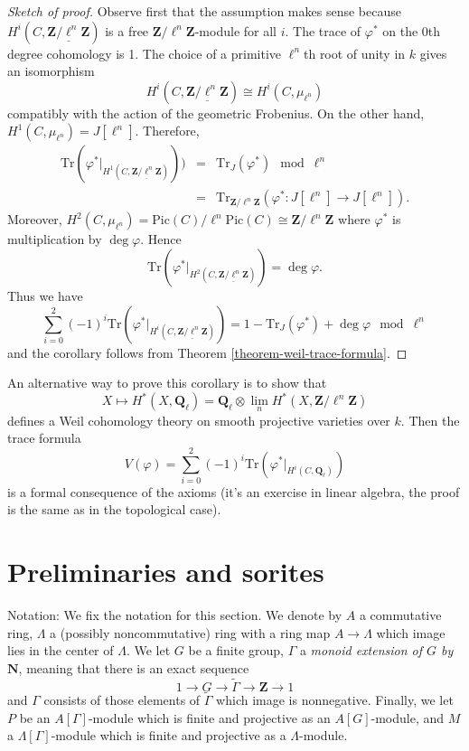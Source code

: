 \begin{proof}[Sketch of proof]
Observe first that the assumption makes sense because $H^i(C,
\underline{\mathbf{Z}/\ell^n \mathbf{Z}})$ is a free $\mathbf{Z}/\ell^n
\mathbf{Z}$-module for all $i$. The trace of $\varphi^*$ on the 0th degree
cohomology is 1. The choice of a primitive $\ell^n$th root of unity in $k$
gives an isomorphism
$$
H^i(C, \underline{\mathbf{Z}/\ell^n \mathbf{Z}}) \cong H^i(C, \mu_{\ell^n})
$$
compatibly with the action of the geometric Frobenius. On the other hand,
$H^1(C, \mu_{\ell^n}) = J[\ell^n]$. Therefore,
\begin{eqnarray*}
\text{Tr}(\varphi^* |_{H^1 (C, \underline{\mathbf{Z}/\ell^n \mathbf{Z}})})) & =
& \text{Tr}_J (\varphi^*) \mod \ell^n \\
& = & \text{Tr}_{\mathbf{Z}/\ell^n \mathbf{Z}} (\varphi^* : J[\ell^n] \to
J[\ell^n]).
\end{eqnarray*}
Moreover, $H^2(C, \mu_{\ell^n}) = \text{Pic}(C)/\ell^n\text{Pic}(C) \cong
\mathbf{Z}/\ell^n \mathbf{Z}$ where $\varphi^*$ is multiplication by $\deg
\varphi$. Hence
$$
\text{Tr} (\varphi^*|_{H^2 (C, \underline{\mathbf{Z}/\ell^n \mathbf{Z}})}) =
\deg \varphi.
$$
Thus we have
$$
\sum_{i=0}^2 (-1)^i \text{Tr}(\varphi^* |_{H^i (C, \underline{\mathbf{Z}/\ell^n
\mathbf{Z}})}) = 1 - \text{Tr}_J(\varphi^*) + \deg \varphi \mod \ell^n
$$
and the corollary follows from Theorem \ref{theorem-weil-trace-formula}.
\end{proof}

An alternative way to prove this corollary is to show that
$$
X \mapsto H^* (X, \mathbf{Q}_\ell) =
\mathbf{Q}_\ell \otimes
\lim_n H^*(X, \mathbf{Z}/\ell^n\mathbf{Z})
$$
defines a Weil cohomology theory on smooth projective varieties over $k$. Then
the trace formula
$$
V(\varphi) = \sum_{i=0}^2 (-1)^i \text{Tr}(\varphi^* |_{H^i
(C, \mathbf{Q}_\ell)})
$$
is a formal consequence of the axioms (it's an exercise in linear algebra, the
proof is the same as in the topological case).




\section{Preliminaries and sorites}
\label{section-preliminaries}

\noindent
Notation:
We fix the notation for this section. We denote by $A$ a commutative ring,
$\Lambda$ a (possibly noncommutative) ring with a ring map $A\to \Lambda$ which
image lies in the center of $\Lambda$. We let $G$ be a finite group, $\Gamma$ a
{\it monoid extension of $G$ by $\mathbf{N}$}, meaning that there is an exact
sequence
$$
1\to G\to \tilde\Gamma\to \mathbf{Z}\to 1
$$
and $\Gamma$ consists of those elements of $\tilde\Gamma$ which image is
nonnegative. Finally, we let $P$ be an $A[\Gamma]$-module which is finite and
projective as an $A[G]$-module, and $M$ a $\Lambda[\Gamma]$-module which is
finite and projective as a $\Lambda$-module.


